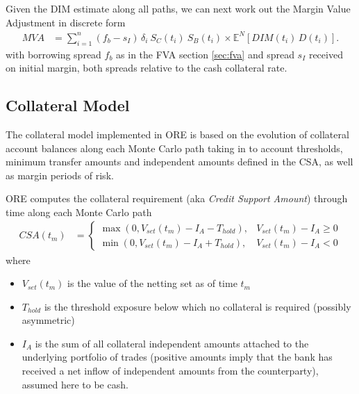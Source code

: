 \documentclass[12pt, a4paper]{article}
\newcommand\E{\ensuremath{\mathbb{E}}}
\newcommand{\MVA}{\mathit{MVA}}
\newcommand{\DIM}{\mathit{DIM}}
\begin{document}
\begin{appendix}
\medskip
Given the DIM estimate along all paths, we can next work out the Margin Value Adjustment \cite{Lichters} in discrete form
\begin{align}
\MVA &= \sum_{i=1}^n (f_b - s_I)\, \delta_i\: S_C(t_i)\: S_B(t_i) \times \E^N\left[
\DIM(t_i)\,D(t_i)\right]. \label{MVA} 
\end{align}
with borrowing spread $f_b$ as in the FVA section \ref{sec:fva} and spread $s_I$ received on initial margin, both
spreads relative to the cash collateral rate.

\subsection{Collateral Model}\label{sec:app_collateral}

The collateral model implemented in ORE is based on the evolution of collateral account balances along each Monte Carlo
path taking in to account thresholds, minimum transfer amounts and independent amounts defined in the CSA, as well as
margin periods of risk.

ORE computes the collateral requirement (aka \emph{Credit Support Amount}) through time along each Monte Carlo path
\begin{align}\label{eq:CSA}
CSA(t_m) &= 
\begin{cases}
\max(0, V_{set}(t_m) - I_A - T_{hold}),& V_{set}(t_m) - I_A \ge 0 \\
\min(0, V_{set}(t_m) - I_A + T_{hold}),& V_{set}(t_m) - I_A < 0
\end{cases}
\end{align}
where
\begin{itemize}
\item $V_{set}(t_m)$ is the value of the netting set as of
  time $t_m$
  \item $T_{hold}$ is the threshold exposure below which no collateral is
  required (possibly asymmetric)
\item $I_A$ is the sum of all collateral independent amounts attached to
  the underlying portfolio of trades (positive amounts imply that the bank
  has received a net inflow of independent amounts from the
  counterparty), assumed here to be cash.
\end{itemize}


\end{appendix}
\end{document}
